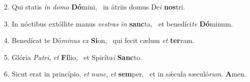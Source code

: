 2. Qui statis \textit{in} \textit{do}\textit{mo} \textbf{Dó}mini, \ast\  in átriis domus De\textit{i} \textbf{nos}tri.\

3. In nóctibus extóllite manus \textit{ves}\textit{tras} \textit{in} \textbf{sanc}ta, \ast\  et benedíci\textit{te} \textbf{Dó}minum.\

4. Benedícat te Dó\textit{mi}\textit{nus} \textit{ex} \textbf{Si}on, \ast\  qui fecit cælum \textit{et} \textbf{ter}ram.\

5. Glória \textit{Pa}\textit{tri}, \textit{et} \textbf{Fí}lio, \ast\  et Spirítu\textit{i} \textbf{Sanc}to.\

6. Sicut erat in princípio, \textit{et} \textit{nunc}, \textit{et} \textbf{sem}per, \ast\  et in sǽcula sæculó\textit{rum}. \textbf{A}men.\

